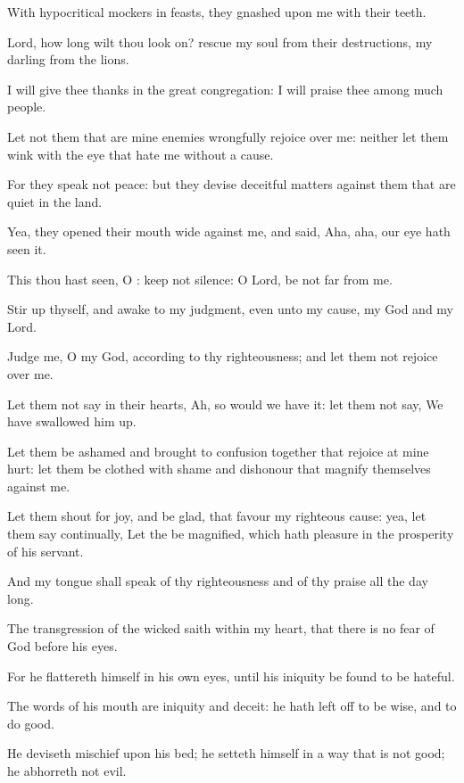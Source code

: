 \Verse With hypocritical mockers in feasts, they gnashed upon me with their teeth.

\Verse Lord, how long wilt thou look on? rescue my soul from their destructions, my darling from the lions.

\Verse I will give thee thanks in the great congregation: I will praise thee among much people.

\Verse Let not them that are mine enemies wrongfully rejoice over me: neither let them wink with the eye that hate me without a cause.

\Verse For they speak not peace: but they devise deceitful matters against them that are quiet in the land.

\Verse Yea, they opened their mouth wide against me, and said, Aha, aha, our eye hath seen it.

\Verse This thou hast seen, O \LORD: keep not silence: O Lord, be not far from me.

\Verse Stir up thyself, and awake to my judgment, even unto my cause, my God and my Lord.

\Verse Judge me, O \LORD my God, according to thy righteousness; and let them not rejoice over me.

\Verse Let them not say in their hearts, Ah, so would we have it: let them not say, We have swallowed him up.

\Verse Let them be ashamed and brought to confusion together that rejoice at mine hurt: let them be clothed with shame and dishonour that magnify themselves against me.

\Verse Let them shout for joy, and be glad, that favour my righteous cause: yea, let them say continually, Let the \LORD be magnified, which hath pleasure in the prosperity of his servant.

\Verse And my tongue shall speak of thy righteousness and of thy praise all the day long.




\Chapter
\Verse The transgression of the wicked saith within my heart, that there is no fear of God before his eyes.

\Verse For he flattereth himself in his own eyes, until his iniquity be found to be hateful.

\Verse The words of his mouth are iniquity and deceit: he hath left off to be wise, and to do good.

\Verse He deviseth mischief upon his bed; he setteth himself in a way that is not good; he abhorreth not evil.

